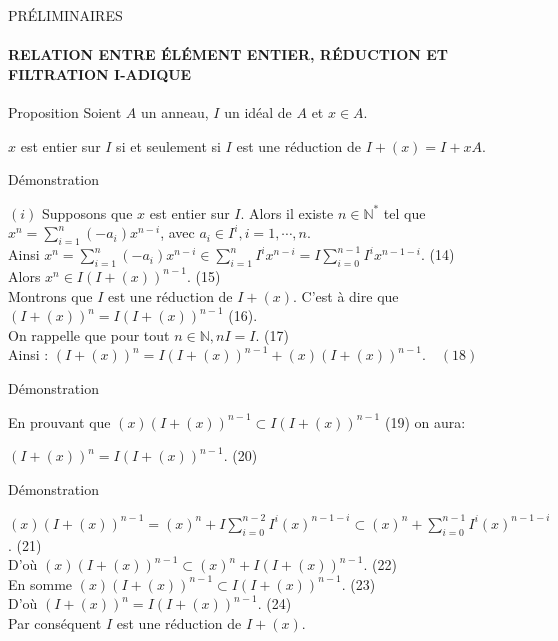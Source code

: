 \documentclass[11pt,a4paper]{beamer}
\begin{document}
		\begin{frame}{PRÉLIMINAIRES}
		\framesubtitle{RELATION ENTRE ÉLÉMENT ENTIER, RÉDUCTION ET FILTRATION I-ADIQUE}
		\begin{block}{Proposition}
				Soient $A$ un anneau, $I$ un idéal de $A$ et $x \in A$.
				\begin{center}
					$x$ est entier sur $I$ si et seulement si $I$ est une réduction de $I + (x) = I +xA $.
				\end{center}
		\end{block}
	\end{frame}
			\begin{frame}{Démonstration}
		\begin{block}{}
	$(i)$ Supposons que $x$ est entier sur $I$. Alors il existe $n \in \mathbb{N^*}$ tel que $x^n = \displaystyle \sum_{i=1}^{n}{(-a_i) x^{n-i}}$, avec $a_i \in I^i, i=1, \cdots ,n$.\\ Ainsi $x^n = \displaystyle \sum_{i=1}^{n}{(-a_i) x^{n-i}} \in \displaystyle \sum_{i=1}^{n}{I^i x^{n-i}} = I \displaystyle \sum_{i=0}^{n-1}{I^i x^{n-1-i}} $. (14)\\ Alors $ x^n \in I(I+(x))^{n-1}.$ (15)\\
	Montrons que $I$ est une réduction de $I + (x)$. C'est à dire que $(I+(x))^{n} = I(I+(x))^{n-1}$ (16).\\ On rappelle que pour tout $n \in \mathbb{N}, nI = I.$ (17)\\
	Ainsi : $(I+(x))^n = I(I+(x))^{n-1} + (x)(I+(x))^{n-1}. \quad (18)$
		\end{block}
	\end{frame}

	
			\begin{frame}{Démonstration}
		\begin{block}{}
			En prouvant que $(x)(I+(x))^{n-1} \subset I(I+(x))^{n-1}$ (19) on aura:
			\begin{center}
				$(I+(x))^n = I(I+(x))^{n-1}$. (20)
			\end{center}
		\end{block}
	\end{frame}
	\begin{frame}{Démonstration}
		\begin{block}{}
			$(x)(I+(x))^{n-1} = (x)^n + I\displaystyle \sum_{i=0}^{n-2}{I^i (x)^{n-1-i}} \subset (x)^n + \displaystyle \sum_{i=0}^{n-1}{I^i (x)^{n-1-i}}$. (21)\\
			D'où $(x)(I+(x))^{n-1} \subset (x)^n + I(I+(x))^{n-1}.$ (22)\\
			En somme $(x)(I+(x))^{n-1} \subset I(I+(x))^{n-1}.$ (23) \\ D'où $ (I+(x))^{n} = I(I+(x))^{n-1}$. (24)\\
			Par conséquent $I$ est une réduction de $I + (x)$.
		\end{block}
	\end{frame}
	
\end{document}
